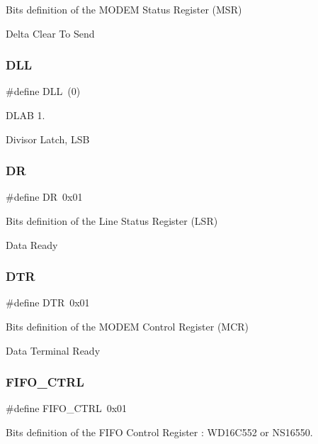 Bits definition of the M\+O\+D\+EM Status Register (M\+SR) 

Delta Clear To Send \mbox{\label{group__i386__uart_ga4466639cd64ebf372a621168c5e25964}} 
\subsubsection{\texorpdfstring{DLL}{DLL}}
{\footnotesize\ttfamily \#define D\+LL~(0)}



D\+L\+AB 1. 

Divisor Latch, L\+SB \mbox{\label{group__i386__uart_ga349dad5e520932e840e6f8fc806bd94d}} 
\subsubsection{\texorpdfstring{DR}{DR}}
{\footnotesize\ttfamily \#define DR~0x01}



Bits definition of the Line Status Register (L\+SR) 

Data Ready \mbox{\label{group__i386__uart_ga67198df5376db153ccd642a81d2623ad}} 
\subsubsection{\texorpdfstring{DTR}{DTR}}
{\footnotesize\ttfamily \#define D\+TR~0x01}



Bits definition of the M\+O\+D\+EM Control Register (M\+CR) 

Data Terminal Ready \mbox{\label{group__i386__uart_gadcd8d113c8791a336768b8da70010ea7}} 
\subsubsection{\texorpdfstring{FIFO\_CTRL}{FIFO\_CTRL}}
{\footnotesize\ttfamily \#define F\+I\+F\+O\+\_\+\+C\+T\+RL~0x01}



Bits definition of the F\+I\+FO Control Register \+: W\+D16\+C552 or N\+S16550. 

